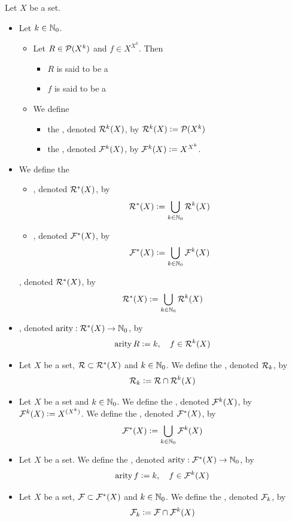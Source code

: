 \documentclass{book}
\begin{document}
   
   \begin{defn}
   	Let $X$ be a set.
   	\begin{itemize}
   		\item Let $k \in \mathbb{N}_0$.
   		\begin{itemize}
   			\item Let $R \in \mathcal{P}(X^k)$ and $f \in X^{X^k}$. Then 
   			\begin{itemize}
   				\item $R$ is said to be a 
   				\item $f$ is said to be a 
   			\end{itemize} 
   			\item We define 
   			\begin{itemize}
   				\item the , denoted $\mathcal{R}^k(X)$, by $\mathcal{R}^k(X) \vcentcolon= \mathcal{P}(X^k)$
   				\item the , denoted $\mathcal{F}^k(X)$, by $\mathcal{F}^k(X) \vcentcolon= X^{X^k}$.
   			\end{itemize}
   		\end{itemize}
   		\item We define the 
   		\begin{itemize}
   			\item {}, denoted $\mathcal{R}^*(X)$, by
   			$$\mathcal{R}^*(X) \vcentcolon= \bigcup_{k \in \mathbb{N}_0} \mathcal{R}^k(X)$$
   			\item {}, denoted $\mathcal{F}^*(X)$, by
   			$$\mathcal{F}^*(X) \vcentcolon= \bigcup_{k \in \mathbb{N}_0} \mathcal{F}^k(X)$$
   		\end{itemize}
   		
   		, denoted $\mathcal{R}^*(X)$, by
   		$$\mathcal{R}^*(X) \vcentcolon= \bigcup_{k \in \mathbb{N}_0} \mathcal{R}^k(X)$$
   		\item  {}, denoted $\operatorname*{\text{arity}}: \mathcal{R}^*(X) \rightarrow \mathbb{N}_0$, by 
   		$$\operatorname*{\text{arity}} R \vcentcolon= k, \quad f \in \mathcal{R}^k(X)$$
   		\item Let $X$ be a set, $\mathcal{R} \subset \mathcal{R}^*(X)$ and $k \in \mathbb{N}_0$. We define the , denoted $\mathcal{R}_k$, by 
   		$$\mathcal{R}_k \vcentcolon= \mathcal{R} \cap \mathcal{R}^k(X)$$
   		\item Let $X$ be a set and $k \in \mathbb{N}_0$. We define the , denoted $\mathcal{F}^k(X)$, by $\mathcal{F}^k(X) \vcentcolon= X^{(X^k)}$. We define the , denoted $\mathcal{F}^*(X)$, by
   		$$\mathcal{F}^*(X) \vcentcolon= \bigcup_{k \in \mathbb{N}_0} \mathcal{F}^k(X)$$
   		\item Let $X$ be a set. We define the , denoted $\operatorname*{\text{arity}}: \mathcal{F}^*(X) \rightarrow \mathbb{N}_0$, by 
   		$$\operatorname*{\text{arity}} f \vcentcolon= k, \quad f \in \mathcal{F}^k(X)$$
   		\item Let $X$ be a set, $\mathcal{F} \subset \mathcal{F}^*(X)$ and $k \in \mathbb{N}_0$. We define the , denoted $\mathcal{F}_k$, by 
   		$$\mathcal{F}_k \vcentcolon= \mathcal{F} \cap \mathcal{F}^k(X)$$
   	\end{itemize}
   \end{defn}
   
\end{document}
